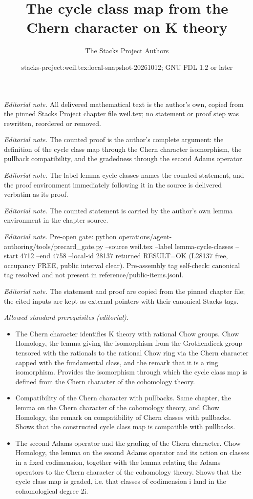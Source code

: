 \documentclass[10pt,a4paper]{amsart}
\title{The cycle class map from the Chern character on K theory}
\author{The Stacks Project Authors}
\date{stacks-project:weil.tex:local-snapshot-20261012; GNU FDL 1.2 or later}
\theoremstyle{plain}
\theoremstyle{definition}
\theoremstyle{remark}
\numberwithin{equation}{subsection}
\begin{document}
\maketitle
\noindent\textit{Editorial note.} All delivered mathematical text is the author's own, copied from the pinned Stacks Project chapter file weil.tex; no statement or proof step was rewritten, reordered or removed.\par\medskip
\noindent\textit{Editorial note.} The counted proof is the author's complete argument: the definition of the cycle class map through the Chern character isomorphism, the pullback compatibility, and the gradedness through the second Adams operator.\par\medskip
\noindent\textit{Editorial note.} The label lemma-cycle-classes names the counted statement, and the proof environment immediately following it in the source is delivered verbatim as its proof.\par\medskip
\noindent\textit{Editorial note.} The counted statement is carried by the author's own lemma environment in the chapter source.\par\medskip
\noindent\textit{Editorial note.} Pre-open gate: python operations/agent-authoring/tools/precard\_gate.py --source weil.tex --label lemma-cycle-classes --start 4712 --end 4758 --local-id 28137 returned RESULT=OK (L28137 free, occupancy FREE, public interval clear). Pre-assembly tag self-check: canonical tag resolved and not present in reference/public-items.jsonl.\par\medskip
\noindent\textit{Editorial note.} The statement and proof are copied from the pinned chapter file; the cited inputs are kept as external pointers with their canonical Stacks tags.\par\medskip
\noindent\textit{Allowed standard prerequisites (editorial).}\begin{itemize}
\item The Chern character identifies K theory with rational Chow groups. Chow Homology, the lemma giving the isomorphism from the Grothendieck group tensored with the rationals to the rational Chow ring via the Chern character capped with the fundamental class, and the remark that it is a ring isomorphism. Provides the isomorphism through which the cycle class map is defined from the Chern character of the cohomology theory.
\item Compatibility of the Chern character with pullbacks. Same chapter, the lemma on the Chern character of the cohomology theory, and Chow Homology, the remark on compatibility of Chern classes with pullbacks. Shows that the constructed cycle class map is compatible with pullbacks.
\item The second Adams operator and the grading of the Chern character. Chow Homology, the lemma on the second Adams operator and its action on classes in a fixed codimension, together with the lemma relating the Adams operators to the Chern character of the cohomology theory. Shows that the cycle class map is graded, i.e. that classes of codimension i land in the cohomological degree 2i.
\end{itemize}\medskip
\end{document}
